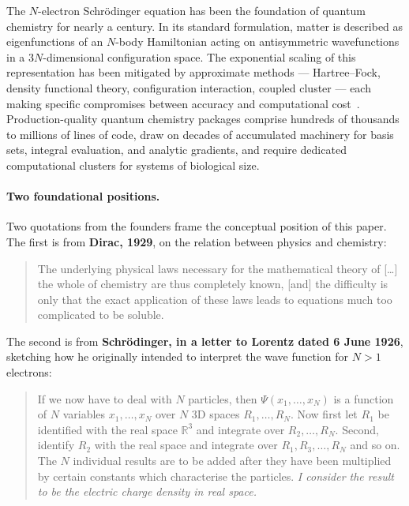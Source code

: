 \documentclass[11pt]{article}
\begin{document}
The $N$-electron Schr\"odinger equation has been the foundation of quantum chemistry for nearly a century. In its standard formulation, matter is described as eigenfunctions of an $N$-body Hamiltonian acting on antisymmetric wavefunctions in a $3N$-dimensional configuration space. The exponential scaling of this representation has been mitigated by approximate methods --- Hartree--Fock, density functional theory, configuration interaction, coupled cluster --- each making specific compromises between accuracy and computational cost~\cite{HK64,KS65,MHG17}. Production-quality quantum chemistry packages comprise hundreds of thousands to millions of lines of code, draw on decades of accumulated machinery for basis sets, integral evaluation, and analytic gradients, and require dedicated computational clusters for systems of biological size.

\paragraph{Two foundational positions.}
Two quotations from the founders frame the conceptual position of this paper. The first is from \textbf{Dirac, 1929}, on the relation between physics and chemistry:

\begin{quote}
The underlying physical laws necessary for the mathematical theory of [\ldots] the whole of chemistry are thus completely known, [and] the difficulty is only that the exact application of these laws leads to equations much too complicated to be soluble.
\end{quote}

The second is from \textbf{Schr\"odinger, in a letter to Lorentz dated 6 June 1926}, sketching how he originally intended to interpret the wave function for $N>1$ electrons:

\begin{quote}
If we now have to deal with $N$ particles, then $\Psi(x_1, \ldots, x_N)$ is a function of $N$ variables $x_1, \ldots, x_N$ over $N$ 3D spaces $R_1, \ldots, R_N$. Now first let $R_1$ be identified with the real space $\mathbb{R}^3$ and integrate over $R_2, \ldots, R_N$. Second, identify $R_2$ with the real space and integrate over $R_1, R_3, \ldots, R_N$ and so on. The $N$ individual results are to be added after they have been multiplied by certain constants which characterise the particles. \emph{I consider the result to be the electric charge density in real space.}
\end{quote}
\end{document}
